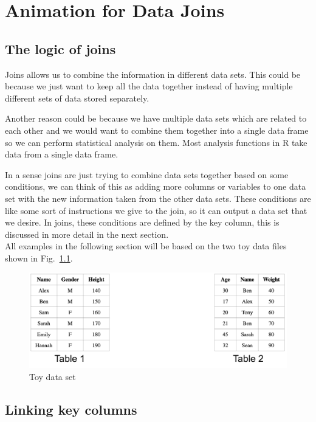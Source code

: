 \chapter{Animation for Data Joins} \label{c3} %

\section{The logic of joins}

Joins allows us to combine the information in different data sets. This could be because we just want to keep all the data together instead of having multiple different sets of data stored separately. 

Another reason could be because we have multiple data sets which are related to each other and we would want to combine them together into a single data frame so we can perform statistical analysis on them.  Most analysis functions in \textsf{R} take data from a single data frame.

In a sense joins are just trying to combine data sets together based on some conditions, we can think of this as adding more columns or variables to one data set with the new information taken from the other data sets. These conditions are like some sort of instructions we give to the join, so it can output a data set that we desire. In joins, these conditions are defined by the key column, this is discussed in more detail in the next section. \\

All examples in the following section will be based on  the two toy data files shown in Fig.~\ref{fig:datoy1}.

\begin{figure}[H]
    \includegraphics[scale = 0.25]{Masters-Thesis/img/datoy1.png}
    \caption{Toy data set}
    \label{fig:datoy1}
\end{figure}


\section{Linking key columns}

